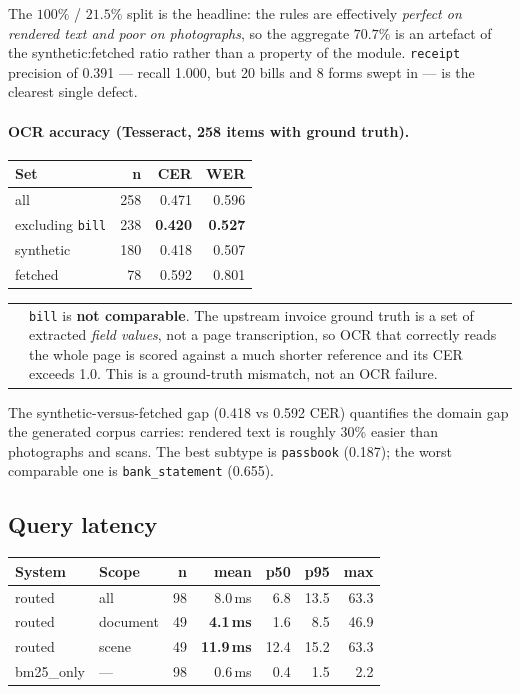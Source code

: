 \documentclass[11pt,a4paper]{article}
\makeatletter
\newenvironment{caveat}
  {\par\vspace{0.6em}\noindent
   \begin{tabular}{@{}p{0.4em}@{\hspace{0.8em}}p{\dimexpr\linewidth-2.2em\relax}@{}}
   \cellcolor{linknavy}\rule{0pt}{1em} &}
  {\end{tabular}\par\vspace{0.6em}}
\newcommand{\code}[1]{\texttt{\small #1}}
\newcommand{\best}[1]{\textbf{#1}}
\makeatother
\begin{document}
The $100\%$ / $21.5\%$ split is the headline: the rules are effectively
\emph{perfect on rendered text and poor on photographs}, so the aggregate
$70.7\%$ is an artefact of the synthetic:fetched ratio rather than a property of
the module. \code{receipt} precision of 0.391 --- recall 1.000, but 20 bills and
8 forms swept in --- is the clearest single defect.

\paragraph{OCR accuracy (Tesseract, 258 items with ground truth).}

\begin{center}
\begin{tabular}{@{}lrrr@{}}
\toprule
\textbf{Set} & \textbf{n} & \textbf{CER} & \textbf{WER} \\
\midrule
all                  & 258 & 0.471 & 0.596 \\
excluding \code{bill}& 238 & \best{0.420} & \best{0.527} \\
synthetic            & 180 & 0.418 & 0.507 \\
fetched              &  78 & 0.592 & 0.801 \\
\bottomrule
\end{tabular}
\end{center}

\begin{caveat}
\code{bill} is \textbf{not comparable}. The upstream invoice ground truth is a
set of extracted \emph{field values}, not a page transcription, so OCR that
correctly reads the whole page is scored against a much shorter reference and its
CER exceeds 1.0. This is a ground-truth mismatch, not an OCR failure.
\end{caveat}

The synthetic-versus-fetched gap (0.418 vs 0.592 CER) quantifies the domain gap
the generated corpus carries: rendered text is roughly 30\% easier than
photographs and scans. The best subtype is \code{passbook} (0.187); the worst
comparable one is \code{bank\_statement} (0.655).

\subsection{Query latency}

\begin{center}
\begin{tabular}{@{}llrrrrr@{}}
\toprule
\textbf{System} & \textbf{Scope} & \textbf{n} & \textbf{mean} & \textbf{p50}
  & \textbf{p95} & \textbf{max} \\
\midrule
routed     & all      & 98 & 8.0\,ms  & 6.8  & 13.5 & 63.3 \\
routed     & document & 49 & \best{4.1\,ms} & 1.6 & 8.5 & 46.9 \\
routed     & scene    & 49 & \best{11.9\,ms} & 12.4 & 15.2 & 63.3 \\
bm25\_only & ---      & 98 & 0.6\,ms  & 0.4  & 1.5  & 2.2 \\
\bottomrule
\end{tabular}
\end{center}
\end{document}
